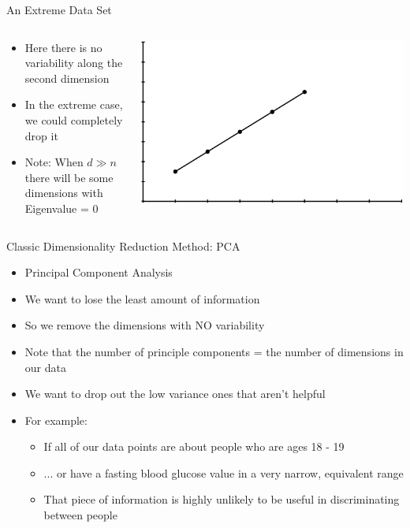 \documentclass[aspectratio=169]{beamer}
\begin{document}
\begin{frame}{An Extreme Data Set}

\begin{columns}
\begin{column}{0.7\textwidth}
\begin{itemize}
\item Here there is no variability along the second dimension
\item In the extreme case, we could completely drop it
\item Note: When $d \gg n$ there will be some dimensions with Eigenvalue = 0  %
\end{itemize}
\end{column}
\begin{column}{0.3\textwidth}
\includegraphics[width=1\textwidth]{lectDimRed/extremeMapping.pdf}
\end{column}
\end{columns}
\end{frame}
\begin{frame}{Classic Dimensionality Reduction Method: PCA}

\begin{itemize}
\item Principal Component Analysis
\item We want to lose the least amount of information
\item So we remove the dimensions with NO variability
\item Note that the number of principle components = the number of dimensions in our data
\item We want to drop out the low variance ones that aren't helpful
\item For example:
\begin{itemize}
\item If all of our data points are about people who are ages 18 - 19
\item ... or have a fasting blood glucose value in a very narrow, equivalent range
\item That piece of information is highly unlikely to be useful in discriminating between people
\end{itemize}
\end{itemize}
\end{frame}
\end{document}
